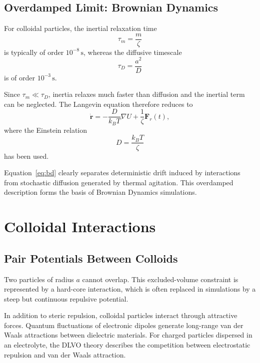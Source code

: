 \documentclass[11pt,a4paper]{article}
\begin{document}
\subsection{Overdamped Limit: Brownian Dynamics}

For colloidal particles, the inertial relaxation time
\begin{equation}
    \tau_m = \frac{m}{\zeta}
\end{equation}
is typically of order $10^{-8}\,\mathrm{s}$, whereas the diffusive timescale
\begin{equation}
    \tau_D = \frac{a^2}{D}
\end{equation}
is of order $10^{-3}\,\mathrm{s}$.

Since $\tau_m \ll \tau_D$, inertia relaxes much faster than diffusion and the inertial term can be neglected. The Langevin equation therefore reduces to
\begin{equation}
    \dot{\mathbf r}
    =
    -\frac{D}{k_B T}\nabla U
    +
    \frac{1}{\zeta}\mathbf F_r(t),
    \label{eq:bd}
\end{equation}
where the Einstein relation
\begin{equation}
    D = \frac{k_B T}{\zeta}
\end{equation}
has been used.

Equation~\eqref{eq:bd} clearly separates deterministic drift induced by interactions from stochastic diffusion generated by thermal agitation. This overdamped description forms the basis of Brownian Dynamics simulations.

\section{Colloidal Interactions}

\subsection{Pair Potentials Between Colloids}

Two particles of radius $a$ cannot overlap. This excluded-volume constraint is represented by a hard-core interaction, which is often replaced in simulations by a steep but continuous repulsive potential.

In addition to steric repulsion, colloidal particles interact through attractive forces. Quantum fluctuations of electronic dipoles generate long-range van der Waals attractions between dielectric materials. For charged particles dispersed in an electrolyte, the DLVO theory describes the competition between electrostatic repulsion and van der Waals attraction.
\end{document}
